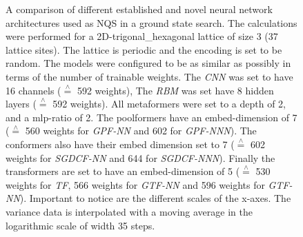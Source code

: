 

\begin{figure}[htbp]
    \centering
    \caption{A comparison of different established and novel neural network architectures used as NQS in a ground state search.
        The calculations were performed for a 2D-trigonal\_hexagonal lattice of size 3 (37 lattice sites).
        The lattice is periodic and the encoding is set to be random.
        The models were configured to be as similar as possibly in terms of the number of trainable weights.
        The \emph{CNN} was set to have 16 channels ($\stackrel{\wedge}{=}$ 592 weights), The \emph{RBM} was set have 8 hidden layers ($\stackrel{\wedge}{=}$ 592 weights). 
        All metaformers were set to a depth of 2, and a mlp-ratio of 2.
        The poolformers have an embed-dimension of 7 ($\stackrel{\wedge}{=}$ 560 weights for \emph{GPF-NN} and 602 for \emph{GPF-NNN}).
        The conformers also have their embed dimension set to 7 ($\stackrel{\wedge}{=}$ 602 weights for \emph{SGDCF-NN} and 644 for \emph{SGDCF-NNN}).
        Finally the transformers are set to have an embed-dimension of 5 ($\stackrel{\wedge}{=}$ 530 weights for \emph{TF}, 566 weights for \emph{GTF-NN} and 596 weights for \emph{GTF-NN}). 
        Important to notice are the different scales of the x-axes. 
        The variance data is interpolated with a moving average in the logarithmic scale of width 35 steps.
    }
    \label{fig:gss-architectures-comp}
\end{figure}